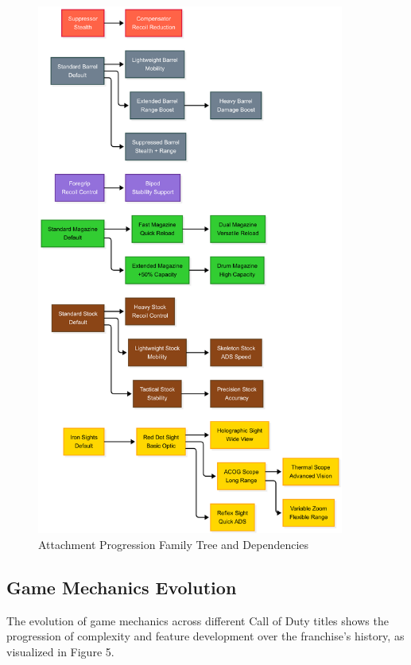 \documentclass[12pt,a4paper]{article}
\begin{document}
\begin{figure}[H]
    \centering
    \includegraphics[width=0.9\textwidth]{../diagrams/attachment-progression-family-tree-vertical.png}
    \caption{Attachment Progression Family Tree and Dependencies}
\end{figure}

\subsection{Game Mechanics Evolution}

The evolution of game mechanics across different Call of Duty titles shows the
progression of complexity and feature development over the franchise's history,
as visualized in Figure 5.
\end{document}
